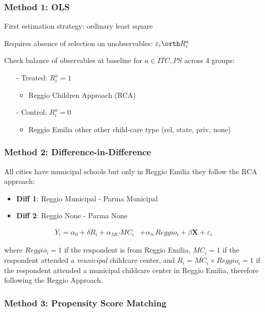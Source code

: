 \begin{frame}
\frametitle{Method 1: OLS}\label{frame:OLS}
First estimation strategy: ordinary least square 

\vspace{3ex}

Requires absence of selection on unobservables: $\varepsilon_{i} \orth R^{a}_{i}$

\vspace{1ex}
Check balance of observables at baseline for $a \in ITC, PS$ across 4 groups:
\begin{itemize}
	\item[-] Treated: $R^{a}_{i}=1$
	\begin{itemize}
		\item Reggio Children Approach (RCA) 
	\end{itemize}
	\item[-] Control: $R^{a}_{i}=0$
	\begin{itemize} \setcounter{enumi}{1}
		\item Reggio Emilia other \hfill {\scriptsize other child-care type (rel, state, priv, none)}
	\end{itemize}
\end{itemize}
\end{frame}
\begin{frame} \frametitle{Method 2: Difference-in-Difference} \label{frame:DiD-model}
All cities have municipal schools but only in Reggio Emilia they follow the RCA approach:
\begin{itemize}
	\item \textbf{Diff 1}: Reggio Municipal - Parma Municipal
	\item \textbf{Diff 2}: Reggio None - Parma None
\end{itemize}

\begin{align}
Y_{i} = \alpha_0+ \delta R_{i} + \alpha_{MC} MC_{i} & +  \alpha_{re} Reggio_{i} + \beta \boldsymbol{X} + \varepsilon_{i} \nonumber  \label{eq8:didpr}
\end{align} 

where $Reggio_{i}=1$ if the respondent is from Reggio Emilia, $MC_{i}=1$ if the respondent attended a \textit{municipal} childcare center, and $R_{i}=MC_{i} \times Reggio_{i}=1$ if the respondent attended a municipal childcare center in Reggio Emilia, therefore following the Reggio Approach.

\end{frame}

\begin{frame} \frametitle{Method 3: Propensity Score Matching}


\end{frame}